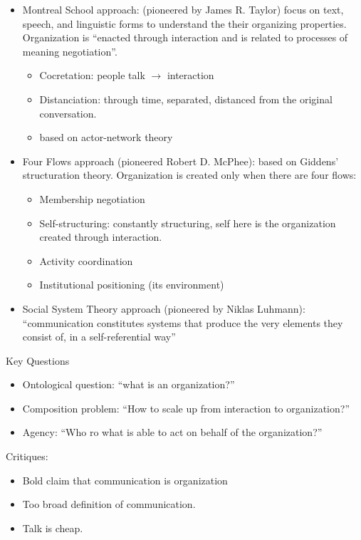 \documentclass[
]{book}
\providecommand{\tightlist}{%
  \setlength{\itemsep}{0pt}\setlength{\parskip}{0pt}}
\begin{document}
\begin{itemize}
\item
  Montreal School approach: (pioneered by James R. Taylor) focus on text, speech, and linguistic forms to understand
  the their organizing properties. Organization is ``enacted through interaction and is related to processes of meaning
  negotiation''.

  \begin{itemize}
  \tightlist
  \item
    Cocretation: people talk \(\to\) interaction
  \item
    Distanciation: through time, separated, distanced from the original conversation.
  \item
    based on actor-network theory
  \end{itemize}
\item
  Four Flows approach (pioneered Robert D. McPhee): based on Giddens' structuration theory. Organization is created
  only when there are four flows:

  \begin{itemize}
  \tightlist
  \item
    Membership negotiation
  \item
    Self-structuring: constantly structuring, self here is the organization created through interaction.
  \item
    Activity coordination
  \item
    Institutional positioning (its environment)
  \end{itemize}
\item
  Social System Theory approach (pioneered by Niklas Luhmann): ``communication constitutes systems that produce the
  very elements they consist of, in a self-referential way''
\end{itemize}

Key Questions

\begin{itemize}
\tightlist
\item
  Ontological question: ``what is an organization?''
\item
  Composition problem: ``How to scale up from interaction to organization?''
\item
  Agency: ``Who ro what is able to act on behalf of the organization?''
\end{itemize}

Critiques:

\begin{itemize}
\tightlist
\item
  Bold claim that communication is organization
\item
  Too broad definition of communication.
\item
  Talk is cheap.
\end{itemize}
\end{document}
